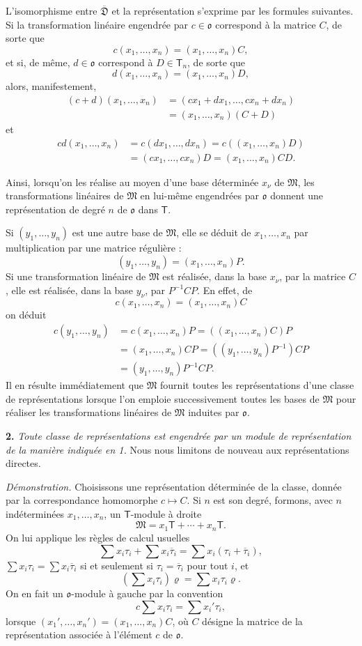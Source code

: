 L'isomorphisme entre $\overline{\mathfrak D}$ et la représentation s'exprime par les formules suivantes. Si la transformation linéaire engendrée par $c\in\mathfrak{o}$ correspond à la matrice $C$, de sorte que
\[
c(x_1,\ldots,x_n)=(x_1,\ldots,x_n)C,
\]
et si, de même, $d\in\mathfrak{o}$ correspond à $D\in\mathsf T_n$, de sorte que
\[
d(x_1,\ldots,x_n)=(x_1,\ldots,x_n)D,
\]
alors, manifestement,
\[
\begin{aligned}
(c+d)(x_1,\ldots,x_n)
&=(cx_1+dx_1,\ldots,cx_n+dx_n)\\
&=(x_1,\ldots,x_n)(C+D)
\end{aligned}
\]
et
\[
\begin{aligned}
cd(x_1,\ldots,x_n)
&=c(dx_1,\ldots,dx_n)=c((x_1,\ldots,x_n)D)\\
&=(cx_1,\ldots,cx_n)D=(x_1,\ldots,x_n)CD.
\end{aligned}
\]

Ainsi, lorsqu'on les réalise au moyen d'une base déterminée $x_\nu$ de $\mathfrak M$, les transformations linéaires de $\mathfrak M$ en lui-même engendrées par $\mathfrak{o}$ donnent une représentation de degré $n$ de $\mathfrak{o}$ dans $\mathsf T$.

Si $(y_1,\ldots,y_n)$ est une autre base de $\mathfrak M$, elle se déduit de $x_1,\ldots,x_n$ par multiplication par une matrice régulière :
\[
(y_1,\ldots,y_n)=(x_1,\ldots,x_n)P.
\]
Si une transformation linéaire de $\mathfrak M$ est réalisée, dans la base $x_\nu$, par la matrice $C$, elle est réalisée, dans la base $y_\nu$, par $P^{-1}CP$. En effet, de
\[
c(x_1,\ldots,x_n)=(x_1,\ldots,x_n)C
\]
on déduit
\[
\begin{aligned}
c(y_1,\ldots,y_n)
&=c(x_1,\ldots,x_n)P=((x_1,\ldots,x_n)C)P\\
&=(x_1,\ldots,x_n)CP=((y_1,\ldots,y_n)P^{-1})CP\\
&=(y_1,\ldots,y_n)P^{-1}CP.
\end{aligned}
\]
Il en résulte immédiatement que $\mathfrak M$ fournit toutes les représentations d'une classe de représentations lorsque l'on emploie successivement toutes les bases de $\mathfrak M$ pour réaliser les transformations linéaires de $\mathfrak M$ induites par $\mathfrak{o}$.

\textbf{2.} \emph{Toute classe de représentations est engendrée par un module de représentation de la manière indiquée en 1.} Nous nous limitons de nouveau aux représentations directes.

\emph{Démonstration.} Choisissons une représentation déterminée de la classe, donnée par la correspondance homomorphe $c\mapsto C$. Si $n$ est son degré, formons, avec $n$ indéterminées $x_1,\ldots,x_n$, un $\mathsf T$-module à droite
\[
\mathfrak M=x_1\mathsf T+\cdots+x_n\mathsf T.
\]
On lui applique les règles de calcul usuelles
\[
\sum x_i\tau_i+\sum x_i\overline{\tau}_i=\sum x_i(\tau_i+\overline{\tau}_i),
\]
$\sum x_i\tau_i=\sum x_i\overline{\tau}_i$ si et seulement si $\tau_i=\overline{\tau}_i$ pour tout $i$, et
\[
\left(\sum x_i\tau_i\right)\varrho=\sum x_i\tau_i\varrho.
\]
On en fait un $\mathfrak{o}$-module à gauche par la convention
\[
c\sum x_i\tau_i=\sum x_i'\tau_i,
\]
lorsque $(x_1',\ldots,x_n')=(x_1,\ldots,x_n)C$, où $C$ désigne la matrice de la représentation associée à l'élément $c$ de $\mathfrak{o}$.

